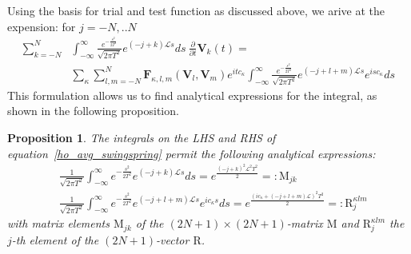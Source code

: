 \documentclass[a4,12pt]{article}
\newtheorem{proposition}[theorem]{Proposition}
\newcommand{\pp}[2]{\frac{\partial #1}{\partial #2}}
\newcommand{\V}{\mathbf{V}}
\newcommand{\M}{\mathrm{M}}
\newcommand{\R}{\mathrm{R}}
\newcommand{\Fu}{\mathbf{F}}
\newcommand{\opL}{\mathcal{L}}
\begin{document}
Using the basis for trial and test function as discussed above, we arive at the expension:
for $j = -N,..N$
 \begin{equation}\label{ho_avg_swingspring}
  \begin{split}
    \sum_{k = -N}^N
   &\int_{-\infty}^{\infty} \frac{e^{-\frac{s^2}{2T^2}}}{\sqrt{2\pi T^2}}
    e^{(-j+k)\opL s}  ds \ \pp{}{t}\V_k(t)   =  \\
  &      \sum_{\kappa} \sum_{l,m = -N}^N \Fu_{\kappa,l, m}(\V_l,\V_m) e^{i {t c_\kappa} }
  \int_{-\infty}^{\infty}\frac{e^{-\frac{s^2}{2T^2}}}{\sqrt{2\pi T^2}}
    e^{(-j + l + m)\opL s} e^{i {sc_\kappa} } ds
  \end{split}
 \end{equation}
This formulation allows us to find analytical expressions for the integral, as shown in the following proposition.
\begin{proposition}\label{prop_coeff}
The integrals on the LHS and RHS of equation~\eqref{ho_avg_swingspring} permit the following analytical expressions:
 \begin{align*}
 &  \frac{1}{\sqrt{2\pi T^2}}\int_{-\infty}^\infty e^{-\frac{s^2}{2T^2}}  e^{(-j+k)\opL s}  ds
  = e^{\frac{(-j + k)^2 \opL^2 T^2}{2}} =:\M_{jk} \\
 &   \frac{1}{\sqrt{2\pi T^2}}\int_{-\infty}^\infty e^{-\frac{s^2}{2T^2}}   e^{(-j+l+m)\opL s} e^{i {c_\kappa} s}  ds =  e^{\frac{(i {c_\kappa} + (-j+ l + m)\opL)^2 T^2}{2}} = :  \R_{j}^{\kappa lm}
 \end{align*}
with matrix elements $\M_{jk}$ of the $(2N+1) \times (2N +1)$-matrix $\M$ and $ \R_{j}^{\kappa lm}$ the $j$-th element of the $(2N+1)$-vector $ \R$.
\end{proposition}
\end{document}

